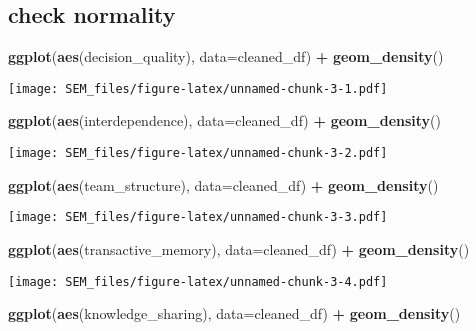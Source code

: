 \documentclass[]{article}
\newenvironment{Shaded}{\begin{snugshade}}{\end{snugshade}}
\newcommand{\DataTypeTok}[1]{\textcolor[rgb]{0.13,0.29,0.53}{#1}}
\newcommand{\KeywordTok}[1]{\textcolor[rgb]{0.13,0.29,0.53}{\textbf{#1}}}
\newcommand{\NormalTok}[1]{#1}
\newcommand{\OperatorTok}[1]{\textcolor[rgb]{0.81,0.36,0.00}{\textbf{#1}}}
\newcommand{\StringTok}[1]{\textcolor[rgb]{0.31,0.60,0.02}{#1}}
\begin{document}
\hypertarget{check-normality}{%
\subsection{check normality}\label{check-normality}}

\begin{Shaded}
\begin{Highlighting}[]
\KeywordTok{ggplot}\NormalTok{(}\KeywordTok{aes}\NormalTok{(decision_quality), }\DataTypeTok{data=}\NormalTok{cleaned_df) }\OperatorTok{+}
\StringTok{  }\KeywordTok{geom_density}\NormalTok{()}
\end{Highlighting}
\end{Shaded}

\texttt{[image: SEM\_files/figure-latex/unnamed-chunk-3-1.pdf]}

\begin{Shaded}
\begin{Highlighting}[]
\KeywordTok{ggplot}\NormalTok{(}\KeywordTok{aes}\NormalTok{(interdependence), }\DataTypeTok{data=}\NormalTok{cleaned_df) }\OperatorTok{+}
\StringTok{  }\KeywordTok{geom_density}\NormalTok{()}
\end{Highlighting}
\end{Shaded}

\texttt{[image: SEM\_files/figure-latex/unnamed-chunk-3-2.pdf]}

\begin{Shaded}
\begin{Highlighting}[]
\KeywordTok{ggplot}\NormalTok{(}\KeywordTok{aes}\NormalTok{(team_structure), }\DataTypeTok{data=}\NormalTok{cleaned_df) }\OperatorTok{+}
\StringTok{  }\KeywordTok{geom_density}\NormalTok{()}
\end{Highlighting}
\end{Shaded}

\texttt{[image: SEM\_files/figure-latex/unnamed-chunk-3-3.pdf]}

\begin{Shaded}
\begin{Highlighting}[]
\KeywordTok{ggplot}\NormalTok{(}\KeywordTok{aes}\NormalTok{(transactive_memory), }\DataTypeTok{data=}\NormalTok{cleaned_df) }\OperatorTok{+}
\StringTok{  }\KeywordTok{geom_density}\NormalTok{()}
\end{Highlighting}
\end{Shaded}

\texttt{[image: SEM\_files/figure-latex/unnamed-chunk-3-4.pdf]}

\begin{Shaded}
\begin{Highlighting}[]
\KeywordTok{ggplot}\NormalTok{(}\KeywordTok{aes}\NormalTok{(knowledge_sharing), }\DataTypeTok{data=}\NormalTok{cleaned_df) }\OperatorTok{+}
\StringTok{  }\KeywordTok{geom_density}\NormalTok{()}
\end{Highlighting}
\end{Shaded}
\end{document}
